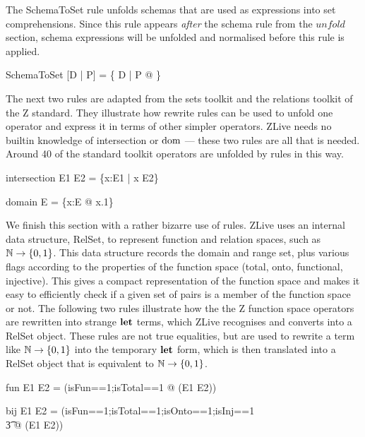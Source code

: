 \documentclass{entcs}
\begin{document}
The SchemaToSet rule unfolds schemas that are used as expressions into
set comprehensions.  Since this rule appears \emph{after} the schema
rule from the $unfold$ section, schema expressions will be unfolded
and normalised before this rule is applied.
\begin{zedrule}{SchemaToSet}
[D | P] = \{ D | P @ \theta [D | true] \}
\end{zedrule}

The next two rules are adapted from the sets toolkit and the relations
toolkit of the Z standard.  They illustrate how rewrite rules can be
used to unfold one operator and express it in terms of other simpler
operators.  ZLive needs no builtin knowledge of intersection or $\mathop{\mathstrut{\mbox{\textrm{dom}}}}\nolimits$
--- these two rules are all that is needed.  Around 40 of the standard
toolkit operators are unfolded by rules in this way.

\begin{zedrule}{intersection}
   E1 \cap E2 = \{x:E1 | x \in E2\}
\end{zedrule}
\begin{zedrule}{domain}
   \dom E = \{x:E @ x.1\}
\end{zedrule}

We finish this section with a rather bizarre use of rules.  ZLive uses
an internal data structure, RelSet, to represent function and relation
spaces, such as $\nat \fun \{0,1\}$.  This data structure records the
domain and range set, plus various flags according to the properties
of the function space (total, onto, functional, injective).  This
gives a compact representation of the function space and makes it easy
to efficiently check if a given set of pairs is a member of the
function space or not.  The following two rules illustrate how the the
Z function space operators are rewritten into strange $\mathop{\mathstrut{\mbox{\textbf{let}}}}\nolimits$ terms,
which ZLive recognises and converts into a RelSet object.  These rules
are not true equalities, but are used to rewrite a term like $\nat
\fun \{0,1\}$ into the temporary $\mathop{\mathstrut{\mbox{\textbf{let}}}}\nolimits$ form, which is then translated
into a RelSet object that is equivalent to $\nat \fun \{0,1\}$.

\begin{zedrule}{fun}
   E1 \fun E2 = (\LET isFun==1;isTotal==1 @ \power (E1 \cross E2))
\end{zedrule}
\begin{zedrule}{bij}
   E1 \bij E2 = (\LET isFun==1;isTotal==1;isOnto==1;isInj==1 \\
   \t3               @ \power (E1 \cross E2))
\end{zedrule}
\end{document}
